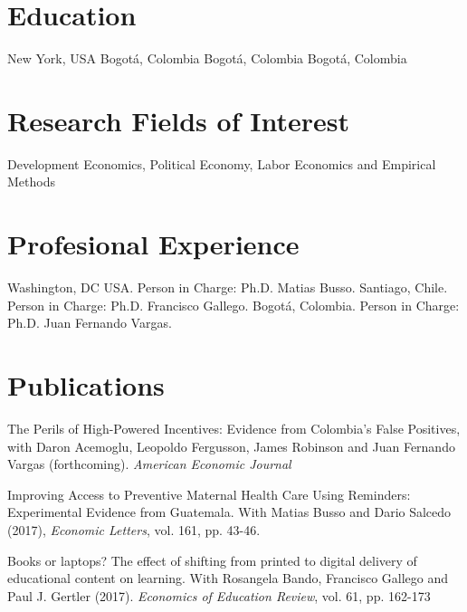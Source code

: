 \documentclass{moderncv}
\begin{document}
\maketitle
\section{\textbf{Education}}
 {New York, USA}{}{}
 {Bogot\'a, Colombia}{}{}
 {Bogot\'a, Colombia}{}{}
 {Bogot\'a, Colombia}{}{}

\section{\textbf{Research Fields of Interest}}
{Development Economics,  Political Economy,  Labor Economics and Empirical Methods }

\section{\textbf{Profesional Experience}}
 {}{}{Washington, DC USA. Person in Charge: Ph.D. Matias Busso.}
 {}{}{Santiago, Chile. Person in Charge: Ph.D. Francisco Gallego.}
 {}{}{Bogot\'a, Colombia. Person in Charge: Ph.D. Juan Fernando Vargas.}

\section{\textbf{Publications}}

{The Perils of High-Powered Incentives: Evidence from Colombia's False Positives, with Daron Acemoglu, Leopoldo Fergusson, James Robinson and Juan Fernando Vargas (forthcoming). \emph{American Economic Journal}\\ }  


{Improving Access to Preventive Maternal Health Care Using Reminders: Experimental Evidence from Guatemala. With Matias Busso and Dario Salcedo (2017), \emph{Economic Letters}, vol. 161, pp. 43-46.\\} 

{Books or laptops? The effect of shifting from printed to digital delivery of educational content on learning. With Rosangela Bando, Francisco Gallego and Paul J. Gertler (2017). \emph{Economics of Education Review}, vol. 61, pp. 162-173\\} 
\end{document}
